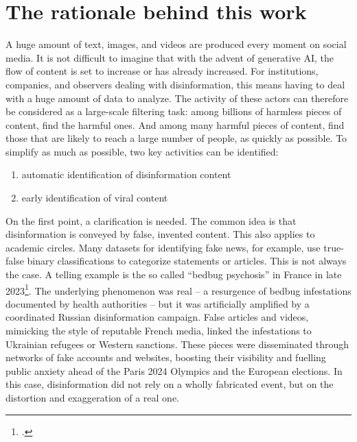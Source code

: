 \documentclass[a4paper,twoside,12pt]{book}
\begin{document}
	\section*{The rationale behind this work}
	
	A huge amount of text, images, and videos are produced every moment on social media.  It is not difficult to imagine that with the advent of generative AI, the flow of content is set to increase or has already increased. For institutions, companies, and observers dealing with disinformation, this means having to deal with a huge amount of data to analyze. The activity of these actors can therefore be considered as a large-scale filtering task: among billions of harmless pieces of content, find the harmful ones. And among many harmful pieces of content, find those that are likely to reach a large number of people, as quickly as possible. To simplify as much as possible, two key activities can be identified:
	
	\begin{enumerate}
	\item automatic identification of disinformation content
	\item early identification of viral content
	\end{enumerate}
	
	On the first point, a clarification is needed. The common idea is that disinformation is conveyed by false, invented content. This also applies to academic circles. Many datasets for identifying fake news, for example, use true-false binary classifications to categorize statements or articles. This is not always the case. A telling example is the so called “bedbug psychosis” in France in late 2023\footcite{tf12024}. The underlying phenomenon was real -- a resurgence of bedbug infestations documented by health authorities -- but it was artificially amplified by a coordinated Russian disinformation campaign. False articles and videos, mimicking the style of reputable French media, linked the infestations to Ukrainian refugees or Western sanctions. These pieces were disseminated through networks of fake accounts and websites, boosting their visibility and fuelling public anxiety ahead of the Paris 2024 Olympics and the European elections. In this case, disinformation did not rely on a wholly fabricated event, but on the distortion and exaggeration of a real one. \\
	
\end{document}
